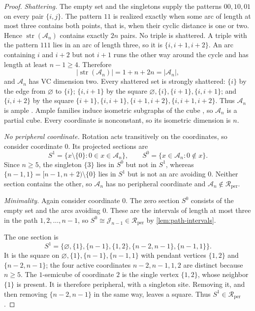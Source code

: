 \documentclass[11pt]{article}
\theoremstyle{definition}
\theoremstyle{remark}
\newcommand{\Rper}{\mathcal R_{\mathrm{per}}}
\newcommand{\strc}{\operatorname{str}}
\begin{document}
\begin{proof}
\emph{Shattering.}  The empty set and the singletons supply the patterns
\(00,10,01\) on every pair \(\{i,j\}\).  The pattern \(11\) is realized
exactly when some arc of length at most three contains both points, that is,
when their cyclic distance is one or two.  Hence
\(\strc(\mathcal A_n)\) contains exactly \(2n\) pairs.  No triple is
shattered.  A triple with the pattern \(111\) lies in an arc of length three,
so it is \(\{i,i+1,i+2\}\).  An arc containing \(i\) and \(i+2\) but not
\(i+1\) runs the other way around the cycle and has length at least
\(n-1\ge4\).  Therefore
\[
 |\strc(\mathcal A_n)|=1+n+2n=|\mathcal A_n|,
\]
and \(\mathcal A_n\) has VC dimension two.  Every shattered set is strongly
shattered: \(\{i\}\) by the edge from \(\varnothing\) to \(\{i\}\);
\(\{i,i+1\}\) by the square
\(\varnothing,\{i\},\{i+1\},\{i,i+1\}\); and \(\{i,i+2\}\) by the square
\(\{i+1\},\{i,i+1\},\{i+1,i+2\},\{i,i+1,i+2\}\).  Thus
\(\mathcal A_n\) is ample \cite{BandeltCDK06}.  Ample families induce
isometric subgraphs of the cube \cite{BandeltCDK06}, so
\(\mathcal A_n\) is a partial cube.  Every coordinate is nonconstant, so its
isometric dimension is \(n\).

\emph{No peripheral coordinate.}  Rotation acts transitively on the
coordinates, so consider coordinate \(0\).  Its projected sections are
\[
 S^1=\{x\setminus\{0\}:0\in x\in\mathcal A_n\},\qquad
 S^0=\{x\in\mathcal A_n:0\notin x\}.
\]
Since \(n\ge5\), the singleton \(\{3\}\) lies in \(S^0\) but not in \(S^1\),
whereas \(\{n-1,1\}=[n-1,n+2)\setminus\{0\}\) lies in \(S^1\) but is not an
arc avoiding \(0\).  Neither section contains the other, so
\(\mathcal A_n\) has no peripheral coordinate and
\(\mathcal A_n\notin\Rper\).

\emph{Minimality.}  Again consider coordinate \(0\).  The zero section
\(S^0\) consists of the empty set and the arcs avoiding \(0\).  These are
the intervals of length at most three in the path \(1,2,\ldots,n-1\), so
\(S^0\cong\mathcal J_{n-1}\in\Rper\) by \cref{lem:path-intervals}.

The one section is
\[
 S^1=\{\varnothing,\{1\},\{n-1\},\{1,2\},\{n-2,n-1\},\{n-1,1\}\}.
\]
It is the square on \(\varnothing,\{1\},\{n-1\},\{n-1,1\}\) with pendant
vertices \(\{1,2\}\) and \(\{n-2,n-1\}\); the four active coordinates
\(n-2,n-1,1,2\) are distinct because \(n\ge5\).  The \(1\)-semicube of
coordinate \(2\) is the single vertex \(\{1,2\}\), whose neighbor \(\{1\}\)
is present.  It is therefore peripheral, with a singleton site.  Removing it,
and then removing \(\{n-2,n-1\}\) in the same way, leaves a square.  Thus
\(S^1\in\Rper\).


\end{proof}
\end{document}

